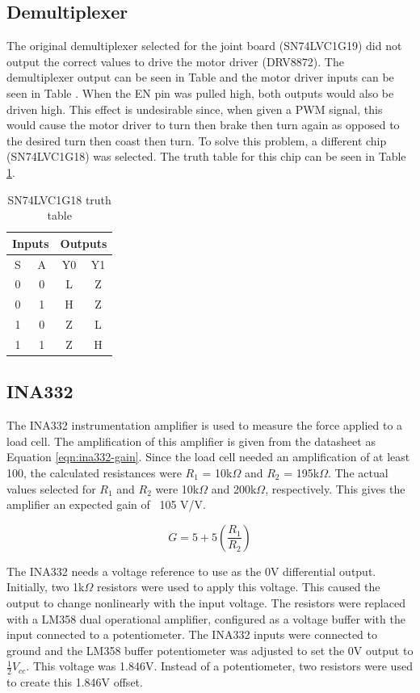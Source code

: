\subsection{Demultiplexer}
The original demultiplexer selected for the joint board (SN74LVC1G19) did not output the correct values to drive the motor driver (DRV8872). The demultiplexer output can be seen in Table  and the motor driver inputs can be seen in Table . When the EN pin was pulled high, both outputs would also be driven high. This effect is undesirable since, when given a PWM signal, this would cause the motor driver to turn then brake then turn again as opposed to the desired turn then coast then turn. To solve this problem, a different chip (SN74LVC1G18) was selected. The truth table for this chip can be seen in Table \ref{tbl:sn74lvc1g18-truth}.
\begin{table}[H]
	\centering
	\caption{SN74LVC1G18 truth table}
	\begin{tabular}{| c  c | c  c| }
		\hline
		\multicolumn{2}{|c|}{Inputs} & \multicolumn{2}{c|}{Outputs} \\
		\hline
		S & A & Y0 & Y1 \\
		\hline
		0 & 0 & L & Z \\
		0 & 1 & H & Z \\
		1 & 0 & Z & L \\
		1 & 1 & Z & H \\
		\hline
	\end{tabular}
	\label{tbl:sn74lvc1g18-truth}
\end{table}

\subsection{INA332}
\label{sec:meth-ina332}
The INA332 instrumentation amplifier is used to measure the force applied to a load cell. The amplification of this amplifier is given from the datasheet as Equation \ref{eqn:ina332-gain}. Since the load cell needed an amplification of at least 100, the calculated resistances were $R_1$ = 10k$\Omega$ and $R_2$ = 195k$\Omega$. The actual values selected for $R_1$ and $R_2$ were 10k$\Omega$ and 200k$\Omega$, respectively. This gives the amplifier an expected gain of ~105 V/V.

\begin{equation}
G = 5 + 5(\frac{R_1}{R_2})
\label{eqn:ina332-gain}
\end{equation}

The INA332 needs a voltage reference to use as the 0V differential output. Initially, two 1k$\Omega$ resistors were used to apply this voltage. This caused the output to change nonlinearly with the input voltage. The resistors were replaced with a LM358 dual operational amplifier, configured as a voltage buffer with the input connected to a potentiometer. The INA332 inputs were connected to ground and the LM358 buffer potentiometer was adjusted to set the 0V output to  $\frac{1}{2} V_{cc}$. This voltage was 1.846V. Instead of a potentiometer, two resistors were used to create this 1.846V offset.

